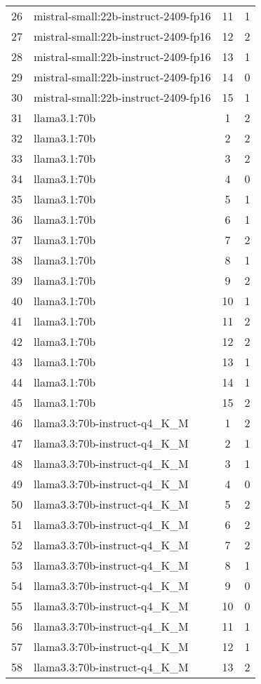 \begin{longtable}{|c|p{7cm}|c|c|}
26 & mistral-small:22b-instruct-2409-fp16 & 11 & 1 \\
27 & mistral-small:22b-instruct-2409-fp16 & 12 & 2 \\
28 & mistral-small:22b-instruct-2409-fp16 & 13 & 1 \\
29 & mistral-small:22b-instruct-2409-fp16 & 14 & 0 \\
30 & mistral-small:22b-instruct-2409-fp16 & 15 & 1 \\
31 & llama3.1:70b & 1 & 2 \\
32 & llama3.1:70b & 2 & 2 \\
33 & llama3.1:70b & 3 & 2 \\
34 & llama3.1:70b & 4 & 0 \\
35 & llama3.1:70b & 5 & 1 \\
36 & llama3.1:70b & 6 & 1 \\
37 & llama3.1:70b & 7 & 2 \\
38 & llama3.1:70b & 8 & 1 \\
39 & llama3.1:70b & 9 & 2 \\
40 & llama3.1:70b & 10 & 1 \\
41 & llama3.1:70b & 11 & 2 \\
42 & llama3.1:70b & 12 & 2 \\
43 & llama3.1:70b & 13 & 1 \\
44 & llama3.1:70b & 14 & 1 \\
45 & llama3.1:70b & 15 & 2 \\
46 & llama3.3:70b-instruct-q4\_K\_M & 1 & 2 \\
47 & llama3.3:70b-instruct-q4\_K\_M & 2 & 1 \\
48 & llama3.3:70b-instruct-q4\_K\_M & 3 & 1 \\
49 & llama3.3:70b-instruct-q4\_K\_M & 4 & 0 \\
50 & llama3.3:70b-instruct-q4\_K\_M & 5 & 2 \\
51 & llama3.3:70b-instruct-q4\_K\_M & 6 & 2 \\
52 & llama3.3:70b-instruct-q4\_K\_M & 7 & 2 \\
53 & llama3.3:70b-instruct-q4\_K\_M & 8 & 1 \\
54 & llama3.3:70b-instruct-q4\_K\_M & 9 & 0 \\
55 & llama3.3:70b-instruct-q4\_K\_M & 10 & 0 \\
56 & llama3.3:70b-instruct-q4\_K\_M & 11 & 1 \\
57 & llama3.3:70b-instruct-q4\_K\_M & 12 & 1 \\
58 & llama3.3:70b-instruct-q4\_K\_M & 13 & 2 \\

\end{longtable}
